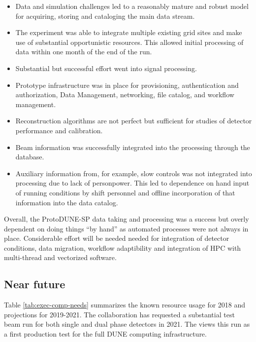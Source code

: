   \begin{itemize}
  \item Data and simulation challenges led to a reasonably mature and robust model for acquiring, storing and cataloging the main data stream.
  \item The experiment was able to integrate multiple existing grid sites and make use of substantial opportunistic resources.  This allowed initial processing of data within one month of the end of the run.
  \item Substantial but successful effort went into signal processing.
  \item Prototype infrastructure was in place for provisioning, authentication and authorization, Data Management, networking, file catalog, and workflow management.
  \item Reconstruction algorithms are not perfect but sufficient for studies of detector performance and calibration.
  \item Beam information was successfully integrated into the processing through the  database.
  \item Auxiliary information from, for example, slow controls was not integrated into processing due to lack of personpower.  This led to dependence on hand input of running conditions by shift personnel and offline incorporation of that information into the data catalog.
  \end{itemize}

  Overall, the ProtoDUNE-SP data taking and processing was a success but overly dependent on doing things ``by hand'' as automated processes were not always in place. Considerable effort will be needed needed for integration of detector conditions, data migration, workflow adaptibility and integration of HPC with multi-thread and vectorized software.

  \subsection{Near future}

  Table \ref{tab:exec-comp-needs} summarizes the known resource usage for 2018 and projections for 2019-2021.  The collaboration has requested a substantial test beam run for both single and dual phase detectors in 2021.  The  views this run as a first production test for the full DUNE computing infrastructure.





